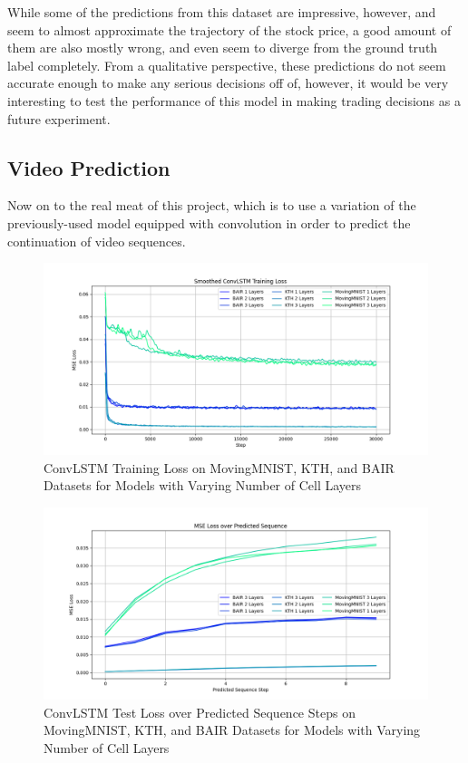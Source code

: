 \documentclass{scrartcl}
\begin{document}
While some of the predictions from this dataset are impressive, however, and
seem to almost approximate the trajectory of the stock price, a good amount of
them are also mostly wrong, and even seem to diverge from the ground truth
label completely. From a qualitative perspective, these predictions do not seem
accurate enough to make any serious decisions off of, however, it would be very
interesting to test the performance of this model in making trading decisions
as a future experiment.

\newpage
\subsection{Video Prediction}
\label{subsec:experiment_vp}

Now on to the real meat of this project, which is to use a variation of the
previously-used model equipped with convolution in order to predict the
continuation of video sequences. 
 
\begin{figure}[H]
	\centering
	\includegraphics[width=1\textwidth]{plots/convlstm_train_loss.png}
	\caption{ConvLSTM Training Loss on MovingMNIST, KTH, and BAIR Datasets for Models with Varying Number of Cell Layers}
	\label{plt:convlstm_train_loss}
\end{figure}

\begin{figure}[H]
	\centering
	\includegraphics[width=1\textwidth]{plots/convlstm_seq_loss.png}
	\caption{ConvLSTM Test Loss over Predicted Sequence Steps on MovingMNIST, KTH, and BAIR Datasets for Models with Varying Number of Cell Layers}
	\label{plt:convlstm_seq_loss}
\end{figure}
\end{document}
